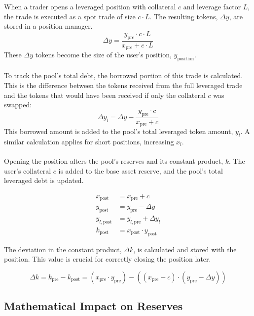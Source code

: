 \documentclass[11pt]{article}
\begin{document}
When a trader opens a leveraged position with collateral $c$ and leverage factor $L$, the trade is executed as a spot trade of size $c \cdot L$. The resulting tokens, $\Delta y$, are stored in a position manager.
\begin{equation}
\Delta y = \frac{y_{\text{pre}} \cdot c \cdot L}{x_{\text{pre}} + c \cdot L}
\end{equation}
These $\Delta y$ tokens become the size of the user's position, $y_{\text{position}}$.
\\\\
To track the pool's total debt, the borrowed portion of this trade is calculated. This is the difference between the tokens received from the full leveraged trade and the tokens that would have been received if only the collateral $c$ was swapped:
\begin{equation}
\Delta y_l = \Delta y - \frac{y_{\text{pre}} \cdot c}{x_{\text{pre}} + c}
\end{equation}
This borrowed amount is added to the pool's total leveraged token amount, $y_l$. A similar calculation applies for short positions, increasing $x_l$.
\\\\
Opening the position alters the pool's reserves and its constant product, $k$. The user's collateral $c$ is added to the base asset reserve, and the pool's total leveraged debt is updated.

\begin{equation}
\begin{aligned}
x_{\text{post}} &= x_{\text{pre}} + c \\
y_{\text{post}} &= y_{\text{pre}} - \Delta y \\
y_{l, \text{post}} &= y_{l, \text{pre}} + \Delta y_l \\
k_{\text{post}} &= x_{\text{post}} \cdot y_{\text{post}}
\end{aligned}
\end{equation}

The deviation in the constant product, $\Delta k$, is calculated and stored with the position. This value is crucial for correctly closing the position later.

\begin{equation}
\Delta k = k_{\text{pre}} - k_{\text{post}} = (x_{\text{pre}} \cdot y_{\text{pre}}) - ((x_{\text{pre}} + c) \cdot (y_{\text{pre}} - \Delta y))
\end{equation}

\subsection{Mathematical Impact on Reserves}
\end{document}
